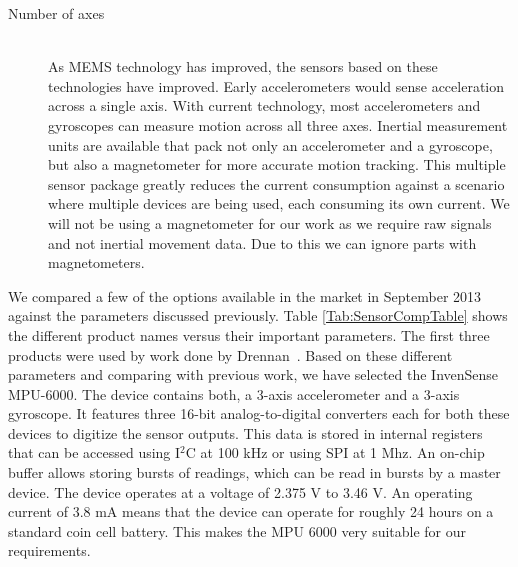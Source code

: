 \begin{description}
\item[Number of axes] \hfill \\
As MEMS technology has improved, the sensors based on these technologies have improved.
Early accelerometers would sense acceleration across a single axis.
With current technology, most accelerometers and gyroscopes can measure motion across all three axes.
Inertial measurement units are available that pack not only an accelerometer and a gyroscope,
but also a magnetometer for more accurate motion tracking.
This multiple sensor package greatly reduces the current consumption against a scenario where multiple devices are being used, each consuming its own current.
We will not be using a magnetometer for our work as we require raw signals and not inertial movement data.
Due to this we can ignore parts with magnetometers.
\end{description}
We compared a few of the options available in the market in September 2013 against the parameters discussed previously.
Table \ref{Tab:SensorCompTable} shows the different product names versus their important parameters.
The first three products were used by work done by Drennan~\cite{drennan2010assessment}.
Based on these different parameters and comparing with previous work,
we have selected the InvenSense MPU-6000.
The device contains both,
a 3-axis accelerometer and a 3-axis gyroscope.
It features three 16-bit analog-to-digital converters each for both these devices to digitize the sensor outputs.
This data is stored in internal registers that can be accessed using I$^{2}$C at 100 kHz or using SPI at 1 Mhz.
An on-chip buffer allows storing bursts of readings, which can be read in bursts by a master device.
The device operates at a voltage of 2.375 V to 3.46 V.
An operating current of 3.8 mA means that the device can operate for roughly 24 hours on a standard coin cell battery.
This makes the MPU 6000 very suitable for our requirements.

